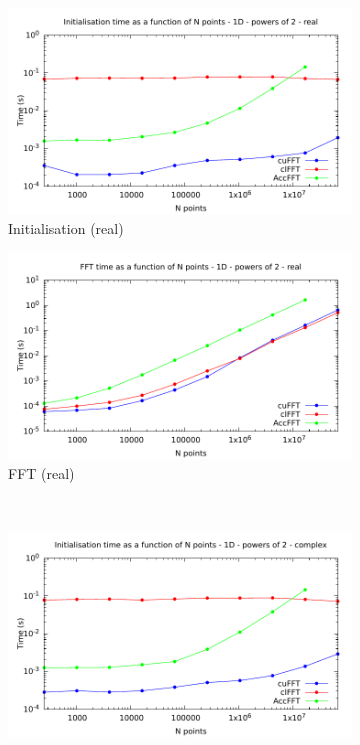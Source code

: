 \documentclass[12pt, a4paper]{article}
\begin{document}
\begin{figure}[htb]
\captionsetup{width=0.8\linewidth}
\centering
\begin{subfigure}{.5\textwidth}
\centering
\includegraphics[width=.9\linewidth]{graphs/fft-1d-pow2-r-init.pdf}
\caption{Initialisation (real)}
\label{FFTPOW21DRI}
\end{subfigure}%
\begin{subfigure}{.5\textwidth}
\centering
\includegraphics[width=.9\linewidth]{graphs/fft-1d-pow2-r-exec.pdf}
\caption{FFT (real)}
\label{FFTPOW21DRE}
\end{subfigure}\\
\begin{subfigure}{.5\textwidth}
\centering
\includegraphics[width=.9\linewidth]{graphs/fft-1d-pow2-c-init.pdf}

\end{subfigure}
\end{figure}
\end{document}
